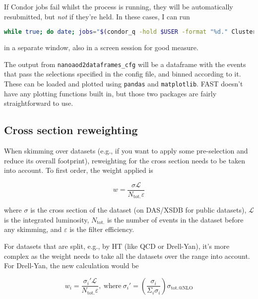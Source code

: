 If Condor jobs fail whilst the process is running, they will be automatically resubmitted, but \emph{not} if they're held. In these cases, I can run

\begin{lstlisting}[belowskip=-0.7cm, language=sh, numbers=none]
while true; do date; jobs="$(condor_q -hold $USER -format "%d." ClusterId -format "%d " ProcId)"; [ -n "$jobs" ] && condor_release $jobs; sleep 120; done
\end{lstlisting}

in a separate window, also in a screen session for good measure. 

The output from \texttt{nanoaod2dataframes\_cfg} will be a dataframe with the events that pass the selections specified in the config file, and binned according to it. These can be loaded and plotted using \texttt{pandas} and \texttt{matplotlib}. FAST doesn't have any plotting functions built in, but those two packages are fairly straightforward to use. 


\subsection{Cross section reweighting}

When skimming over datasets (e.g., if you want to apply some pre-selection and reduce its overall footprint), reweighting for the cross section needs to be taken into account. To first order, the weight applied is

\begin{equation}
w = \frac{ \sigma \mathcal{L} }{ N_{\mathrm{tot.}} \varepsilon }
\end{equation}

where $\sigma$ is the cross section of the dataset (on DAS/XSDB for public datasets), $\mathcal{L}$ is the integrated luminosity, $N_{\mathrm{tot.}}$ is the number of events in the dataset before any skimming, and $\varepsilon$ is the filter efficiency.

For datasets that are split, e.g., by HT (like QCD or Drell-Yan), it's more complex as the weight needs to take all the datasets over the range into account. For Drell-Yan, the new calculation would be

\begin{equation}
w_i = \frac{ \sigma_i ' \mathcal{L} }{ N_{\mathrm{tot.}} \varepsilon }, \ \mathrm{where} \ \sigma_i ' = \left( \frac{\sigma_i}{\Sigma_i \sigma_i} \right) \sigma_{\mathrm{tot.@NLO}}
\end{equation}

